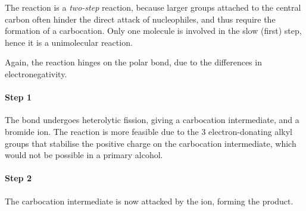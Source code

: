 			The \snone{} reaction is a \textit{two-step} reaction, because larger groups attached to the central carbon
			often hinder the direct attack of nucleophiles, and thus require the formation of a carbocation. Only one molecule
			is involved in the slow (first) step, hence it is a unimolecular reaction.

			Again, the reaction hinges on the polar  bond, due to the differences in electronegativity.

			\paragraph{Step 1}


			The  bond undergoes heterolytic fission, giving a carbocation intermediate, and a bromide ion. The reaction is more
			feasible due to the 3 electron-donating alkyl groups that stabilise the positive charge on the carbocation intermediate, which
			would not be possible in a primary alcohol.

			\paragraph{Step 2}


			The carbocation intermediate is now attacked by the  ion, forming the product.


